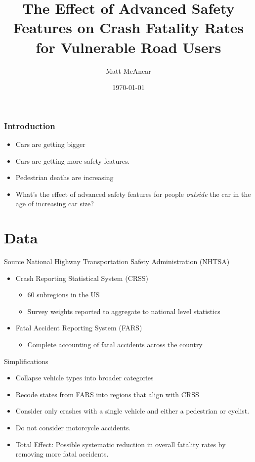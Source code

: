 \documentclass{beamer}
\title[Road Fatalities and Safety Features]{The Effect of Advanced Safety Features on Crash Fatality Rates for Vulnerable Road Users}
\author{Matt McAnear}
\institute{University of Michigan}
\date{\today}
\begin{document}
\frame{\titlepage}

\begin{frame}
\frametitle{Introduction}

\begin{itemize}
    \item Cars are getting bigger\cite{kovach_rise_2021}
    \item Cars are getting more safety features. 
    \item Pedestrian deaths are increasing\cite{tyndall_effect_2024}
    \item What's the effect of advanced safety features for people \textit{outside} the car in the age of increasing car size?
\end{itemize}
\end{frame}

\section{Data}

\begin{frame}{Source}
National Highway Transportation Safety Administration (NHTSA) 
\begin{itemize}
    \item Crash Reporting Statistical System (CRSS)
    \begin{itemize}
        \item 60 subregions in the US
        \item Survey weights reported to aggregate to national level statistics
    \end{itemize}
    \item Fatal Accident Reporting System (FARS) 
    \begin{itemize}
        \item Complete accounting of fatal accidents across the country
    \end{itemize}
\end{itemize}

\end{frame}

\begin{frame}{Simplifications}
\begin{itemize}
    \item Collapse vehicle types into broader categories
    \item Recode states from FARS into regions that align with CRSS
    \item Consider only crashes with a single vehicle and either a pedestrian or cyclist.
    \item Do not consider motorcycle accidents.
    \item Total Effect: Possible systematic reduction in overall fatality rates by removing more fatal accidents.
\end{itemize}
\end{frame}
\end{document}
